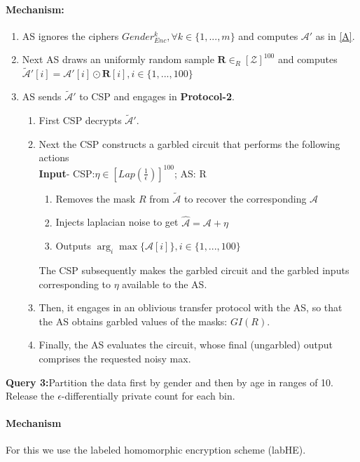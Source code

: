 \paragraph{Mechanism:}\begin{enumerate}\item AS ignores the ciphers $Gender^k_{Enc}, \forall k \in \{1,...,m\}$ and computes $\mathcal{A}'$ as in \eqref{A}. \item Next AS draws an uniformly random sample $\textbf{R} \in_R [\mathcal{Z}]^{100}$ and computes $\tilde{\mathcal{A}}'[i]=\mathcal{A}'[i]\odot\textbf{R}[i], i \in \{1,...,100\}$ \item AS sends $\tilde{\mathcal{A}}'$ to CSP and engages in \textbf{Protocol-2}. \begin{enumerate}\item First CSP decrypts $\tilde{\mathcal{A}}'$. \item Next the CSP constructs a garbled circuit that performs the following actions \\\textbf{Input}- CSP:$\eta \in [Lap(\frac{1}{\epsilon})]^{100}$; AS: R \begin{enumerate}\item Removes the mask $R$ from $\tilde{\mathcal{A}}$ to recover the corresponding $\mathcal{A}$
\item Injects laplacian noise to get $\hat{\mathcal{A}}=\mathcal{A}+\eta$ \item Outputs $\arg_{i}\max\{\mathcal{A}[i]\}, i \in \{1,...,100\}$  \end{enumerate}  The CSP subsequently makes the garbled circuit  and the garbled inputs corresponding to $\eta$ available
to the AS. \item Then, it engages in an oblivious transfer
protocol with the AS, so that the AS obtains garbled
values of the masks: $GI(R)$. 
\item Finally, the AS evaluates
the circuit, whose final (ungarbled) output comprises the
requested noisy max.\end{enumerate}
\end{enumerate}
\textbf{Query 3:}Partition the data first by gender and then by age in ranges of 10. Release the $\epsilon$-differentially private  count for each bin. \paragraph{Mechanism}For this we use the labeled homomorphic encryption scheme (labHE).

